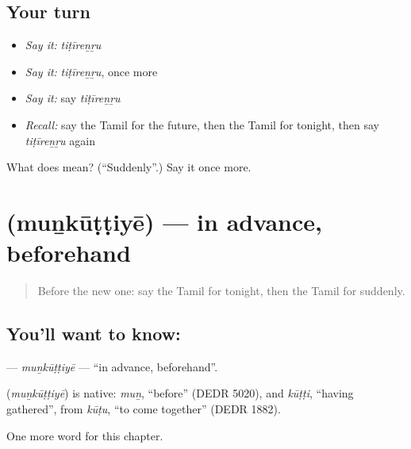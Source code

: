 \subsection*{Your turn}
\begin{itemize}
\raggedright
  \item \emph{Say it:} \emph{tiṭīreṉṟu}
  \item \emph{Say it:} \emph{tiṭīreṉṟu}, once more
  \item \emph{Say it:} say \emph{tiṭīreṉṟu}
  \item \emph{Recall:} say the Tamil for the future, then the Tamil for tonight, then say \emph{tiṭīreṉṟu} again
\end{itemize}

\begin{tcolorbox}[breakable,colback=teal!4,colframe=teal!35!black,title={Before you move on}]
What does  mean? (\textquotedblleft{}Suddenly\textquotedblright{}.) Say it once more.
\end{tcolorbox}
\section[\texorpdfstring{\ta{முன்கூட்டியே} (muṉkūṭṭiyē)}{முன்கூட்டியே (muṉkūṭṭiyē)}]{ (muṉkūṭṭiyē) — in advance, beforehand}

\label{lesson:TA-C172-munkuttiye}



\begin{quote}
Before the new one: say the Tamil for tonight, then the Tamil for suddenly.
\end{quote}

\subsection*{You'll want to know: }
\textbf{} — \emph{muṉkūṭṭiyē} — \textquotedblleft{}in advance, beforehand\textquotedblright{}.

\begin{cousinweb}
\textbf{} (\emph{muṉkūṭṭiyē}) is native: \emph{muṉ}, \textquotedblleft{}before\textquotedblright{} (DEDR 5020), and \emph{kūṭṭi}, \textquotedblleft{}having gathered\textquotedblright{}, from \emph{kūṭu}, \textquotedblleft{}to come together\textquotedblright{} (DEDR 1882).
\end{cousinweb}

\begin{grammarlens}[title={What you've built}]
One more word for this chapter.
\end{grammarlens}

